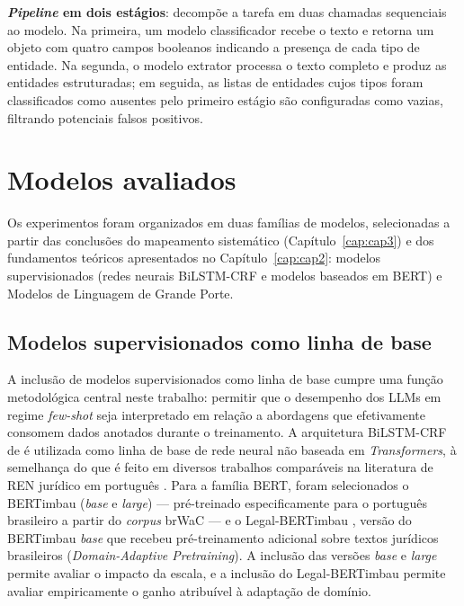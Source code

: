 \textbf{\textit{Pipeline} em dois estágios}: decompõe a tarefa em duas chamadas sequenciais ao modelo. Na primeira, um modelo classificador recebe o texto e retorna um objeto com quatro campos booleanos indicando a presença de cada tipo de entidade. Na segunda, o modelo extrator processa o texto completo e produz as entidades estruturadas; em seguida, as listas de entidades cujos tipos foram classificados como ausentes pelo primeiro estágio são configuradas como vazias, filtrando potenciais falsos positivos.

\section{Modelos avaliados}
\label{sec:modelos}

Os experimentos foram organizados em duas famílias de modelos, selecionadas a partir das conclusões do mapeamento sistemático (Capítulo~\ref{cap:cap3}) e dos fundamentos teóricos apresentados no Capítulo~\ref{cap:cap2}: modelos supervisionados (redes neurais BiLSTM-CRF e modelos baseados em BERT) e Modelos de Linguagem de Grande Porte.

\subsection{Modelos supervisionados como linha de base}
\label{sec:baseline_supervisionado}

A inclusão de modelos supervisionados como linha de base cumpre uma função metodológica central neste trabalho: permitir que o desempenho dos LLMs em regime \textit{few-shot} seja interpretado em relação a abordagens que efetivamente consomem dados anotados durante o treinamento. A arquitetura BiLSTM-CRF de  é utilizada como linha de base de rede neural não baseada em \textit{Transformers}, à semelhança do que é feito em diversos trabalhos comparáveis na literatura de REN jurídico em português \cite{Araujo2018,albuquerque2023ulyssesner}. Para a família BERT, foram selecionados o BERTimbau (\textit{base} e \textit{large}) \cite{Souza2020} --- pré-treinado especificamente para o português brasileiro a partir do \textit{corpus} brWaC --- e o Legal-BERTimbau \cite{melo2022legalbertimbau}, versão do BERTimbau \textit{base} que recebeu pré-treinamento adicional sobre textos jurídicos brasileiros (\textit{Domain-Adaptive Pretraining}). A inclusão das versões \textit{base} e \textit{large} permite avaliar o impacto da escala, e a inclusão do Legal-BERTimbau permite avaliar empiricamente o ganho atribuível à adaptação de domínio.

